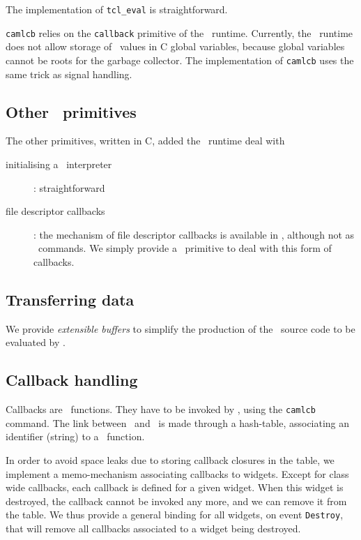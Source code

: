 The implementation of \verb|tcl_eval| is straightforward.

\verb|camlcb| relies on the \verb|callback| primitive of the \caml\
runtime. Currently, the \caml\ runtime does not allow storage of \caml\
values in C global variables, because global variables cannot be roots for
the garbage collector. The implementation of \verb|camlcb| uses the same
trick as signal handling.

\subsection{Other \camltk\ primitives}
The other primitives, written in C, added the \caml\ runtime deal with
\begin{description}
\item[initialising a \tcl\ interpreter] :  straightforward
\item[file descriptor callbacks] : the mechanism of file descriptor
callbacks is available in \tk, although not as \tcl\ commands. We simply
provide a \caml\ primitive to deal with this form of callbacks.
\end{description} 

\subsection{Transferring data}
We provide {\em extensible buffers} to simplify the production of the \tcl\
source code to be evaluated by \tcl.

\subsection{Callback handling}
Callbacks are \caml\ functions. They have to be invoked by \tcl, using the
\verb|camlcb| command. The link between \tcl\ and \caml\ is made through
a hash-table, associating an identifier (string) to a \caml\ function.

In order to avoid space leaks due to storing callback closures in the table,
we implement a memo-mechanism associating callbacks to widgets.
Except for class wide callbacks, each callback is defined for a given
widget. When this widget is destroyed, the callback cannot be invoked any
more, and we can remove it from the table. We thus provide a general binding
for all widgets, on event \verb|Destroy|, that will remove all callbacks
associated to a widget being destroyed.
